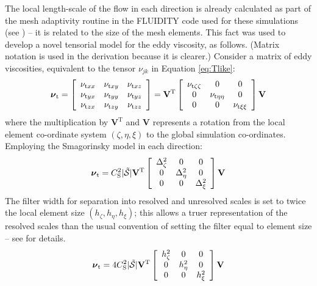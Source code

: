 The local length-scale of the flow in each direction is already
calculated as part of the mesh adaptivity routine in the FLUIDITY
code used for these simulations (see \cite{PUO01}) -- it is
related to the size of the mesh elements. This fact was used to
develop a novel tensorial model for the eddy viscosity, as
follows. (Matrix notation is used in the derivation because it is
clearer.) Consider a matrix of eddy viscosities, equivalent to the
tensor $\nu_{jk}$ in Equation \ref{eq:Tlike}:
\begin{equation}
\mbox{\boldmath$\nu$}_{\textrm{t}} = \left[ \begin{array}{ccc}
\nu_{\textrm{t}xx} & \nu_{\textrm{t}xy} & \nu_{\textrm{t}xz} \\
\nu_{\textrm{t}yx} & \nu_{\textrm{t}yy} & \nu_{\textrm{t}yz} \\
\nu_{\textrm{t}zx} & \nu_{\textrm{t}zy} & \nu_{\textrm{t}zz}
\end{array} \right] =
\mathbf{V}^{\textrm{T}} \left[ \begin{array}{ccc}
\nu_{\textrm{t}\zeta\zeta} & 0 & 0 \\
0 & \nu_{\textrm{t}\eta\eta} & 0 \\
0 & 0 & \nu_{\textrm{t}\xi\xi}
\end{array} \right] \mathbf{V}
\end{equation}
where the multiplication by $\mathbf{V}^{\textrm{T}}$ and
$\mathbf{V}$ represents a rotation from the local element
co-ordinate system $(\zeta,\eta,\xi)$ to the global simulation
co-ordinates. Employing the Smagorinsky model in each direction:
\begin{equation}
\mbox{\boldmath$\nu$}_{\textrm{t}} =
C_{\textrm{S}}^2|\tilde{\mathcal{S}}| \mathbf{V}^{\textrm{T}}
\left[ \begin{array}{ccc}
\Delta_\zeta^2 & 0 & 0 \\
0 & \Delta_\eta^2 & 0 \\
0 & 0 & \Delta_\xi^2
\end{array} \right] \mathbf{V}
\end{equation}
The filter width for separation into resolved and unresolved
scales is set to twice the local element size
$(h_\zeta,h_\eta,h_\xi)$; this allows a truer representation of
the resolved scales than the usual convention of setting the
filter equal to element size -- see \cite{Pop00} for details.
\begin{equation}
\mbox{\boldmath$\nu$}_{\textrm{t}} =
4C_{\textrm{S}}^2|\tilde{\mathcal{S}}| \mathbf{V}^{\textrm{T}}
\left[ \begin{array}{ccc}
h_\zeta^2 & 0 & 0 \\
0 & h_\eta^2 & 0 \\
0 & 0 & h_\xi^2
\end{array} \right] \mathbf{V}
\end{equation}

